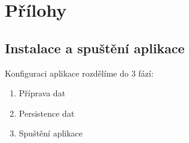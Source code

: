 \documentclass[12pt,a4paper]{report}
\begin{document}



\tableofcontents











\listoffigures


\appendix
\chapter{Přílohy}

\section{Instalace a spuštění aplikace}

Konfiguraci aplikace rozdělíme do $3$ fází:

\begin{enumerate}
    \item Příprava dat
    \item Persistence dat
    \item Spuštění aplikace
\end{enumerate}
\end{document}
